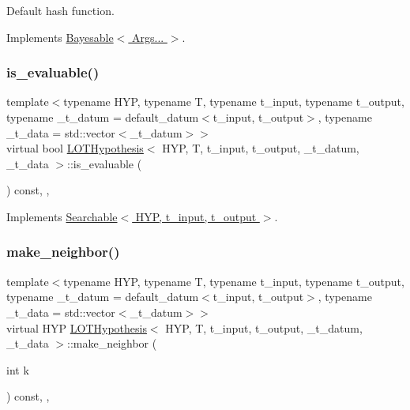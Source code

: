 Default hash function. 



Implements \hyperlink{class_bayesable_ab77a023d33951448e6edb2e1bc79c5ae}{Bayesable$<$ Args... $>$}.

\mbox{\label{class_l_o_t_hypothesis_a68dedaeae92b25b0450f2dc1bd95a35b}} 
\subsubsection{\texorpdfstring{is\+\_\+evaluable()}{is\_evaluable()}}
{\footnotesize\ttfamily template$<$typename H\+YP, typename T, typename t\+\_\+input, typename t\+\_\+output, typename \+\_\+t\+\_\+datum = default\+\_\+datum$<$t\+\_\+input, t\+\_\+output$>$, typename \+\_\+t\+\_\+data = std\+::vector$<$\+\_\+t\+\_\+datum$>$$>$ \\
virtual bool \hyperlink{class_l_o_t_hypothesis}{L\+O\+T\+Hypothesis}$<$ H\+YP, T, t\+\_\+input, t\+\_\+output, \+\_\+t\+\_\+datum, \+\_\+t\+\_\+data $>$\+::is\+\_\+evaluable (\begin{DoxyParamCaption}{ }\end{DoxyParamCaption}) const\hspace{0.3cm}{\ttfamily [inline]}, {\ttfamily [override]}, {\ttfamily [virtual]}}



Implements \hyperlink{class_searchable_aae16f1cb01f140f4033f6f67dc9753b6}{Searchable$<$ H\+Y\+P, t\+\_\+input, t\+\_\+output $>$}.

\mbox{\label{class_l_o_t_hypothesis_ae7771176b8b2599f42c75318ee0e9164}} 
\subsubsection{\texorpdfstring{make\+\_\+neighbor()}{make\_neighbor()}}
{\footnotesize\ttfamily template$<$typename H\+YP, typename T, typename t\+\_\+input, typename t\+\_\+output, typename \+\_\+t\+\_\+datum = default\+\_\+datum$<$t\+\_\+input, t\+\_\+output$>$, typename \+\_\+t\+\_\+data = std\+::vector$<$\+\_\+t\+\_\+datum$>$$>$ \\
virtual H\+YP \hyperlink{class_l_o_t_hypothesis}{L\+O\+T\+Hypothesis}$<$ H\+YP, T, t\+\_\+input, t\+\_\+output, \+\_\+t\+\_\+datum, \+\_\+t\+\_\+data $>$\+::make\+\_\+neighbor (\begin{DoxyParamCaption}\item[{int}]{k }\end{DoxyParamCaption}) const\hspace{0.3cm}{\ttfamily [inline]}, {\ttfamily [override]}, {\ttfamily [virtual]}}



